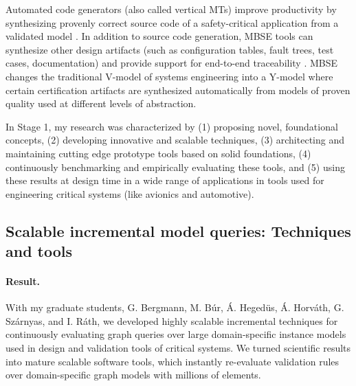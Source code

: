 Automated code generators (also called vertical MTs) improve productivity by synthesizing provenly correct source code of a safety-critical application from a validated model \cite{Sturmer-TSE2007}. In addition to source code generation, MBSE tools can synthesize other design artifacts (such as configuration tables, fault trees, test cases, documentation) and provide support for end-to-end traceability \cite{Aizenbud-IBMSystems-2006}. MBSE changes the traditional V-model of systems engineering into a Y-model where certain certification artifacts are synthesized automatically from models of proven quality used at different levels of abstraction.

In Stage 1, my research was characterized by (1) proposing novel, foundational concepts, (2) developing innovative and scalable techniques, (3) architecting and maintaining cutting edge prototype tools based on solid foundations, (4) continuously benchmarking and empirically evaluating these tools, and (5) using these results at design time in a wide range of applications in tools used for engineering critical systems (like avionics and automotive). 

\subsection{Scalable incremental model queries: Techniques and tools}

\paragraph{Result.}
With my graduate students, G. Bergmann, M. Búr, Á. Hegedüs, Á. Horváth, G. Szárnyas, and I. Ráth, we developed highly scalable incremental techniques for continuously evaluating graph queries over large domain-specific instance models used in design and validation tools of critical systems. We turned scientific results \cite{models-2010-incquery,scp2015,models2014-iqd,icgt2015,sosym2016-viatra-invited} into mature scalable software tools, which instantly re-evaluate validation rules over domain-specific graph models with millions of elements. 

